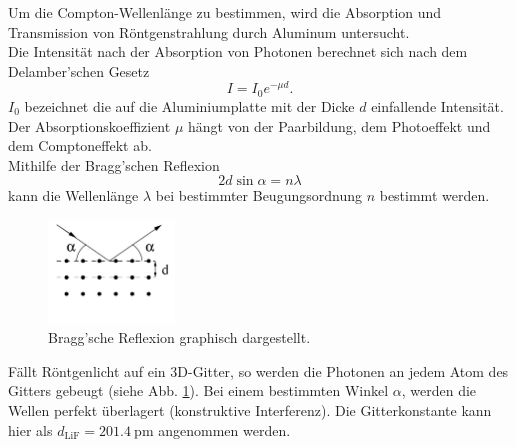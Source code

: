 Um die Compton-Wellenlänge zu bestimmen, wird die Absorption und Transmission von Röntgenstrahlung durch Aluminum untersucht.
\\
Die Intensität nach der Absorption von Photonen berechnet sich nach dem Delamber'schen Gesetz
\begin{equation}
    I = I_0 e^{-\mu d} .
\end{equation}
$I_0$ bezeichnet die auf die Aluminiumplatte mit der Dicke $d$ einfallende Intensität.
Der Absorptionskoeffizient $\mu$ hängt von der Paarbildung, dem Photoeffekt und dem Comptoneffekt ab.
\\
Mithilfe der Bragg'schen Reflexion 
\begin{equation}
    2 d \sin \alpha = n \lambda
    \label{eqn:lambdaalpha}
\end{equation}
kann die Wellenlänge $\lambda$ bei bestimmter Beugungsordnung $n$ bestimmt werden.
\begin{figure}
    \centering
    \includegraphics[width=0.3\textwidth]{content/data/kristall.jpg}
    \caption{Bragg'sche Reflexion graphisch dargestellt. \cite[2]{anleitung}}
    \label{fig:bragg}
\end{figure}
Fällt Röntgenlicht auf ein 3D-Gitter, so werden die Photonen an jedem Atom des Gitters gebeugt (siehe Abb. \ref{fig:bragg}).
Bei einem bestimmten Winkel $\alpha$, werden die Wellen perfekt überlagert (konstruktive Interferenz).
Die Gitterkonstante kann hier als $d_\text{LiF}=\SI{201.4}{\pico\metre}$ angenommen werden.